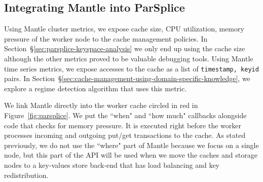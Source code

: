 \subsection{Integrating Mantle into ParSplice}

Using Mantle cluster metrics, we expose cache size, CPU utilization, memory
pressure of the worker node to the cache management policies. In
Section~\S\ref{sec:parsplice-keyspace-analysis} we only end up using the cache
size although the other metrics proved to be valuable debugging tools. Using
Mantle time series metrics, we expose accesses to the cache as a list of
\texttt{timestamp, keyid} pairs. In
Section~\S\ref{sec:cache-management-using-domain-specific-knowledge}, we
explore a regime detection algorithm that uses this metric.

We link Mantle directly into the worker cache circled in red in
Figure~\ref{fig:parsplice}. We put the ``when" and ``how much" callbacks
alongside code that checks for memory pressure. It is executed right before the
worker processes incoming and outgoing put/get transactions to the cache. As
stated previously, we do not use the ``where" part of Mantle because we focus
on a single node, but this part of the API will be used when we move the caches
and storage nodes to a key-values store back-end that has load balancing and key
redistribution.
